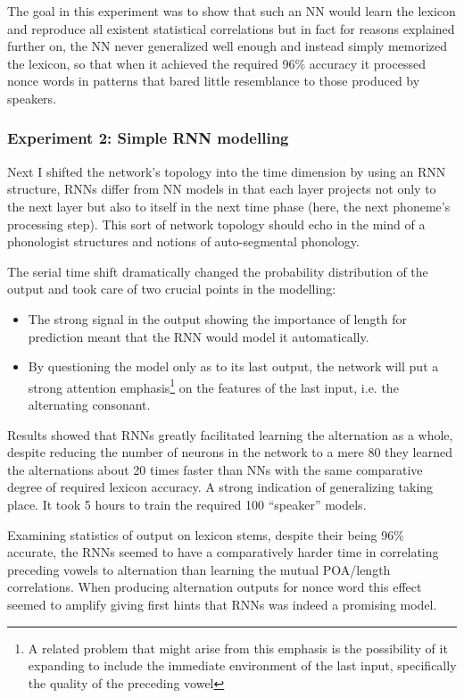 \documentclass[a4paper,12pt]{article}
\begin{document}
The goal in this experiment was to show that such an NN would learn the lexicon and reproduce all
existent statistical correlations but in fact for reasons explained further on, the NN never
generalized well enough and instead simply memorized the lexicon, so that when it achieved the
required 96\% accuracy it processed nonce words in patterns that bared little resemblance to those
produced by speakers.

\subsubsection{Experiment 2: Simple RNN modelling}

Next I shifted the network's topology into the time dimension by using an RNN structure, RNNs differ
from NN models in that each layer projects not only to the next layer but also to itself in the
next time phase (here, the next phoneme's processing step). This sort of network topology should
echo in the mind of a phonologist structures and notions of auto-segmental phonology.

The serial time shift dramatically changed the probability distribution of the output and took care
of two crucial points in the modelling:
\begin{itemize}
  \item The strong signal in the output showing the importance of length for prediction meant that
  the RNN would model it automatically.
  \item By questioning the model only as to its last output, the network will put a strong attention
  emphasis\footnote{A related problem that might arise from this emphasis is the possibility of it
  expanding to include the immediate environment of the last input, specifically the quality of the
  preceding vowel} on the features of the last input, i.e. the alternating consonant.
\end{itemize}

Results showed that RNNs greatly facilitated learning the alternation as a whole, despite reducing
the number of neurons in the network to a mere 80 they learned the alternations about 20 times
faster than NNs with the same comparative degree of required lexicon accuracy. A strong indication
of generalizing taking place. It took 5 hours to train the required 100 ``speaker'' models.

Examining statistics of output on lexicon stems, despite their being 96\% accurate, the RNNs seemed
to have a comparatively harder time in correlating preceding vowels to alternation than learning the
mutual POA/length correlations. When producing alternation outputs for nonce word this effect seemed
to amplify giving first hints that RNNs was indeed a promising model.
\end{document}
